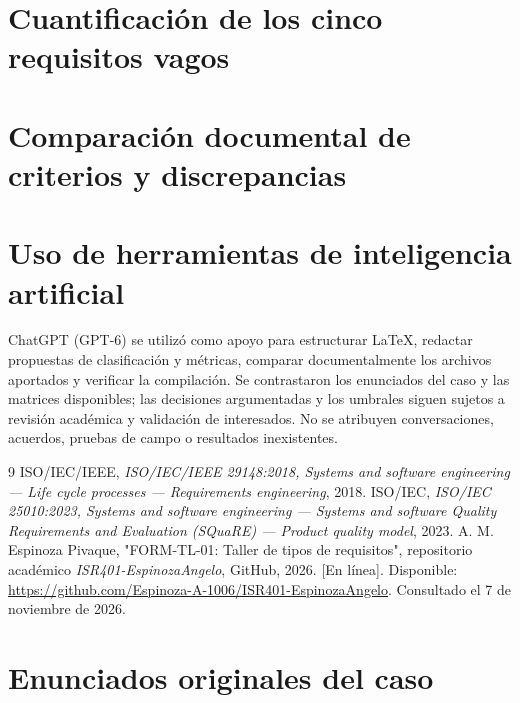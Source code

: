 \documentclass[11pt,a4paper]{article}
\begin{document}
\section{Cuantificación de los cinco requisitos vagos}


\section{Comparación documental de criterios y discrepancias}


\section{Uso de herramientas de inteligencia artificial}
ChatGPT (GPT-6) se utilizó como apoyo para estructurar LaTeX, redactar propuestas de clasificación y métricas, comparar documentalmente los archivos aportados y verificar la compilación. Se contrastaron los enunciados del caso y las matrices disponibles; las decisiones argumentadas y los umbrales siguen sujetos a revisión académica y validación de interesados. No se atribuyen conversaciones, acuerdos, pruebas de campo o resultados inexistentes.

\begin{thebibliography}{9}
 ISO/IEC/IEEE, \emph{ISO/IEC/IEEE 29148:2018, Systems and software engineering --- Life cycle processes --- Requirements engineering}, 2018.
 ISO/IEC, \emph{ISO/IEC 25010:2023, Systems and software engineering --- Systems and software Quality Requirements and Evaluation (SQuaRE) --- Product quality model}, 2023.
 A. M. Espinoza Pivaque, "FORM-TL-01: Taller de tipos de requisitos", repositorio académico \emph{ISR401-EspinozaAngelo}, GitHub, 2026. [En línea]. Disponible: \url{https://github.com/Espinoza-A-1006/ISR401-EspinozaAngelo}. Consultado el 7 de noviembre de 2026.
\end{thebibliography}

\appendix
\section{Enunciados originales del caso}

\end{document}
